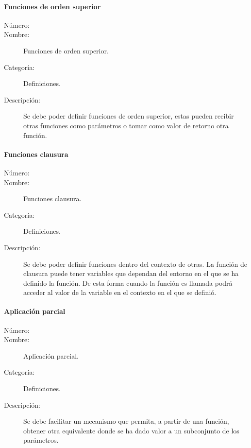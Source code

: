 \paragraph{Funciones de orden superior}
	\begin{description}
		\item [Número:] \cn
		\item [Nombre:]  Funciones de orden superior.
		\item [Categoría:] Definiciones.
		\item [Descripción:] Se debe poder definir funciones de orden superior, estas pueden recibir otras funciones como parámetros o tomar como valor de 
      retorno otra función.  
	\end{description}

\paragraph{Funciones clausura}
	\begin{description}
		\item [Número:] \cn
		\item [Nombre:]  Funciones clausura.
		\item [Categoría:] Definiciones.
		\item [Descripción:] Se debe poder definir funciones dentro del contexto de otras. La función de clausura puede tener variables que dependan 
      del entorno en el que se ha definido la función. De esta forma cuando la función es llamada podrá acceder al valor de la variable en el contexto
      en el que se definió.
	\end{description}

\paragraph{Aplicación parcial}
	\begin{description}
		\item [Número:] \cn
		\item [Nombre:] Aplicación parcial.
		\item [Categoría:] Definiciones.
		\item [Descripción:] Se debe facilitar un mecanismo que permita, a partir de una función, obtener otra
      equivalente donde se ha dado valor a un subconjunto de los parámetros.
    \end{description}

